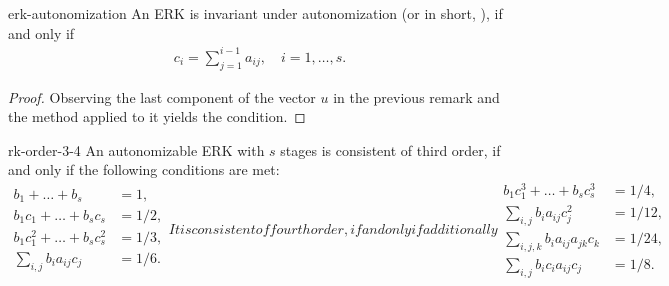 \begin{Lemma}{erk-autonomization}
  An ERK is invariant under autonomization (or in short,
  ), if and only if
  \begin{gather}
    \label{eq:explicit:9}
    c_i = \sum_{j=1}^{i-1} a_{ij}, \quad i=1,\dots,s.
  \end{gather}
\end{Lemma}

\begin{proof}
  Observing the last component of the vector $u$ in the previous
  remark and the method applied to it yields the condition.
\end{proof}

\begin{Lemma}{rk-order-3-4}
  An autonomizable ERK with $s$ stages is consistent of third order, if
  and only if the following conditions are met:
  \begin{subequations}
    \label{eq:explicit:11}
    \begin{align}
      \label{eq:explicit:12}
      b_1 + \dots + b_s &= 1, \\
      \label{eq:explicit:13}
      b_1c_1 + \dots + b_s c_s &= 1/2, \\
      \label{eq:explicit:14}
      b_1c_1^2 + \dots + b_s c_s^2 &= 1/3, \\
      \label{eq:explicit:15}
      \sum\nolimits_{i,j} b_i a_{ij}c_j &= 1/6.
    \end{align}
    It is consistent of fourth order, if and only if additionally
    \begin{align}
    \label{eq:explicit:16}
    b_1c_1^3 + \dots + b_s c_s^3 &= 1/4, \\
    \label{eq:explicit:18}
    \sum\nolimits_{i,j} b_i a_{ij} c_j^2 &= 1/12, \\
    \label{eq:explicit:19}
    \sum\nolimits_{i,j,k} b_i a_{ij} a_{jk} c_k &= 1/24,\\
    \label{eq:explicit:17}
    \sum\nolimits_{i,j} b_i c_i a_{ij} c_j &= 1/8.
  \end{align}
  \end{subequations}
\end{Lemma}

